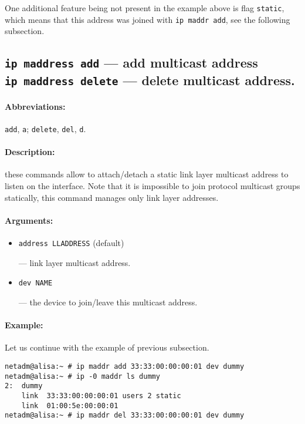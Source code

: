 One additional feature being not present in the example above
is flag \verb|static|, which means that this address was joined
with \verb|ip maddr add|, see the following subsection.



\subsection{{\tt ip maddress add} --- add multicast address\\
	    {\tt ip maddress delete} --- delete multicast address.}

\paragraph{Abbreviations:} \verb|add|, \verb|a|; \verb|delete|, \verb|del|, \verb|d|.

\paragraph{Description:} these commands allow to attach/detach
a static link layer multicast address to listen on the interface.
Note that it is impossible to join protocol multicast groups
statically, this command manages only link layer addresses.


\paragraph{Arguments:}

\begin{itemize}
\item \verb|address LLADDRESS| (default)

--- link layer multicast address.

\item \verb|dev NAME|

--- the device to join/leave this multicast address.

\end{itemize}


\paragraph{Example:} Let us continue with the example of previous subsection.

\begin{verbatim}
netadm@alisa:~ # ip maddr add 33:33:00:00:00:01 dev dummy
netadm@alisa:~ # ip -0 maddr ls dummy
2:  dummy
    link  33:33:00:00:00:01 users 2 static
    link  01:00:5e:00:00:01
netadm@alisa:~ # ip maddr del 33:33:00:00:00:01 dev dummy
\end{verbatim}

